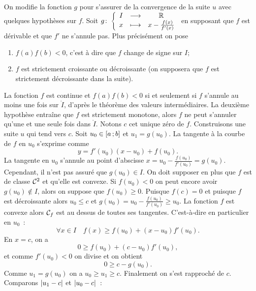 On modifie la fonction \(g\) pour s'assurer de la convergence de la suite \(u\) 
avec quelques hypothèses sur \(f\). Soit 
\(g\colon \left\{\begin{array}{ccc} I & \longrightarrow &\mathbb{R}\\ x & \longmapsto & x-\frac{f(x)}{f'(x)} \end{array} \right.\) en supposant que \(f\) est 
dérivable et que \(f'\) ne s'annule pas. Plus précisément on pose
\begin{enumerate}
  \item \(f(a)f(b) <0\), c'est à dire que \(f\) change de signe sur \(I\);
  \item \(f\) est strictement croissante ou décroissante (on supposera que \(f\) 
    est strictement décroissante dans la suite).
\end{enumerate}
La fonction \(f\) est continue et \(f(a)f(b) <0\) si et seulement si \(f\) 
s'annule au moins une fois sur \(\mathring{I}\), d'après le théorème des valeurs 
intermédiaires. La deuxième hypothèse entraîne que \(f\) est strictement 
monotone, alors \(f\) ne peut s'annuler qu'une et une seule fois dans 
\(\mathring{I}\). Notons \(c\) cet unique zéro de \(f\). Construisons une suite 
\(u\) qui tend vers \(c\). Soit \(u_0 \in \left[ a \, ;  b \right]\) et 
\(u_1=g(u_0)\). La tangente à la courbe de \(f\) en \(u_0\) s'exprime comme
\begin{equation}
  y=f'(u_0)(x-u_0)+f(u_0).
\end{equation}
La tangente en \(u_0\) s'annule au point d'abscisse \(x= 
u_0-\frac{f(u_0)}{f'(u_0)}=g(u_0)\). Cependant, il n'est pas assuré que \(g(u_0) 
\in I\). On doit supposer en plus que \(f\) est de classe \(\mathcal{C}^{2}\) et 
qu'elle est convexe. Si \(f(u_0) <0\) on peut encore avoir \(g(u_0) \notin I\), 
alors on suppose que \(f(u_0) \geqslant 0\). Puisque \(f(c)=0\) et puisque \(f\) 
est décroissante alors \(u_0 \leqslant c\) et \(g(u_0)=u_0 - 
\frac{f(u_0)}{f'(u_0)} \geqslant u_0\). La fonction \(f\) est convexe alors 
\(\mathcal{C}_f\) est au dessus de toutes ses tangentes. C'est-à-dire en particulier 
en \(u_0\)~:
\begin{equation}
  \forall x \in I \quad f(x) \geqslant f(u_0)+(x-u_0)f'(u_0).
\end{equation}
En \(x=c\), on a
\begin{equation}
  0 \geqslant f(u_0)+(c-u_0)f'(u_0),
\end{equation}
et comme \(f'(u_0) < 0\) on divise et on obtient
\begin{equation}
  0 \geqslant c - g(u_0).
\end{equation}
Comme \(u_1=g(u_0)\) on a \(u_0 \geqslant u_1 \geqslant c\). Finalement on s'est 
rapproché de \(c\). Comparons \(\left\lvert u_1-c\right\rvert\) et \(\left\lvert u_0-c\right\rvert\)~:
